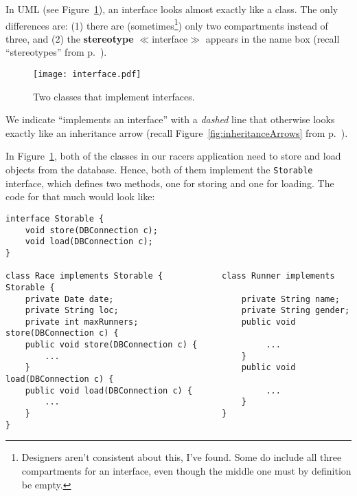 In UML (see Figure~\ref{fig:interface}), an interface looks almost exactly
like a class. The only differences are: (1) there are
(sometimes\footnote{Designers aren't consistent about this, I've found. Some
do include all three compartments for an interface, even though the middle one
must by definition be empty.}) only two compartments instead of three, and (2)
the \textbf{stereotype} $\ll$interface$\gg$ appears in the name box (recall
``stereotypes'' from p.~\pageref{stereotype}).

\begin{figure}[ht]
\centering
\texttt{[image: interface.pdf]}
\caption{Two classes that implement interfaces.}
\label{fig:interface}
\end{figure}

We indicate ``implements an interface'' with a \textit{dashed} line that
otherwise looks exactly like an inheritance arrow (recall
Figure~\ref{fig:inheritanceArrows} from p.~\pageref{page:inheritanceArrows}).

In Figure~\ref{fig:interface}, both of the classes in our racers 
application need to store and load objects from the database. Hence, both of
them implement the \texttt{Storable} interface, which defines two methods, one
for storing and one for loading. The code for that much would look like:

\begin{Verbatim}[fontsize=\scriptsize,samepage=true,frame=single]
interface Storable {
    void store(DBConnection c);
    void load(DBConnection c);
}

class Race implements Storable {            class Runner implements Storable {                        
    private Date date;                          private String name;
    private String loc;                         private String gender;
    private int maxRunners;                     public void store(DBConnection c) {
    public void store(DBConnection c) {              ...
        ...                                     }
    }                                           public void load(DBConnection c) {
    public void load(DBConnection c) {               ...
        ...                                     }
    }                                       }                                          
}                                            
\end{Verbatim}

